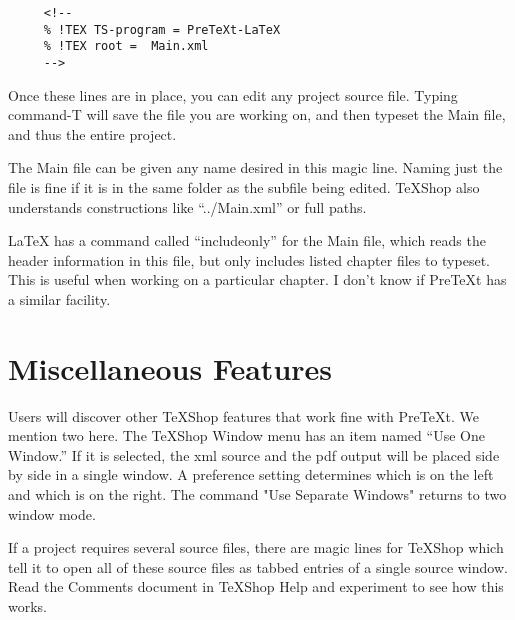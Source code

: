 \documentclass[11pt, oneside]{article}   	%
\begin{document}
\begin{verbatim}
     <!--
     % !TEX TS-program = PreTeXt-LaTeX
     % !TEX root =  Main.xml
     -->
\end{verbatim}

Once these lines are in place, you can edit any project source file. Typing command-T will save the file you are working on, and then typeset the Main file, and thus the entire project.

The Main file can be given any name desired in this magic line. Naming just the file is fine if it is in the same folder as the subfile being edited. TeXShop also understands constructions like ``../Main.xml'' or full paths. 

LaTeX has a command called ``includeonly'' for the Main file, which reads the header information in this file, but only includes listed chapter files to typeset. This is useful when working on a particular chapter. I don't know if PreTeXt has a similar facility.

\section{Miscellaneous Features}

Users will discover other TeXShop features that work fine with PreTeXt. We mention two here. The TeXShop Window menu has an item named ``Use One Window.'' If it is selected, the xml source and the pdf output will be placed side by side in a single window. A preference setting determines which is on the left and which is on the right. The command "Use Separate Windows" returns to two window mode.

If a project requires several source files, there are magic lines for TeXShop which tell it to open all of these source files as tabbed entries of a single source window. Read the Comments document in TeXShop Help and experiment to see how this works.
\end{document}
